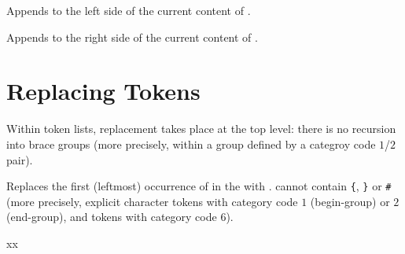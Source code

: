 \documentclass[oneside]{book}
\begin{document}
\begin{function}{\TlPutLeft}
\begin{syntax}
  
\end{syntax}
Appends  to the left side of the current content of .
\begin{demohigh}
\TlSet {}
\TlPutLeft {}
\TlUse \lTmpkTl
\end{demohigh}
\end{function}

\begin{function}{\TlPutRight}
\begin{syntax}
  
\end{syntax}
Appends  to the right side of the current content of .
\begin{demohigh}
\TlSet {}
\TlPutRight {}
\TlUse \lTmpkTl
\end{demohigh}
\end{function}

\section{Replacing Tokens}

Within token lists, replacement takes place at the top level: there is
no recursion into brace groups (more precisely, within a group defined by
a categroy code $1$/$2$ pair).

\begin{function}{\TlVarReplaceOnce}
\begin{syntax}
   
\end{syntax}
Replaces the first (leftmost) occurrence of  in the
 with . 
cannot contain \verb|{|, \verb|}| or \verb|#|
(more precisely, explicit character tokens with category code $1$
(begin-group) or $2$ (end-group), and tokens with category code $6$).
\begin{demohigh}
\TlSet {}
\TlVarReplaceOnce {} {xx}
\TlUse \lTmpaTl
\end{demohigh}
\end{function}
\end{document}
